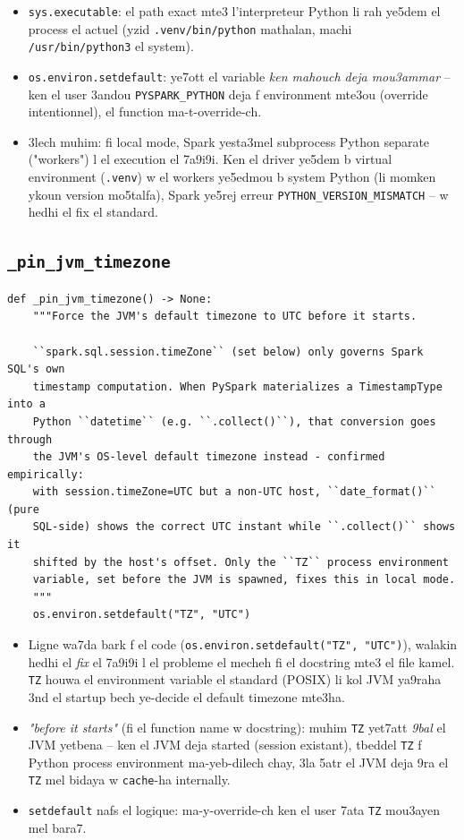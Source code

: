 \documentclass[11pt,a4paper]{report}
\DeclareRobustCommand{\code}[1]{\texttt{#1}}
\begin{document}
\begin{itemize}
  \item \code{sys.executable}: el path exact mte3 l'interpreteur Python li
        rah ye5dem el process el actuel (yzid \code{.venv/bin/python} mathalan,
        machi \code{/usr/bin/python3} el system).
  \item \code{os.environ.setdefault}: ye7ott el variable \emph{ken mahouch
        deja mou3ammar} -- ken el user 3andou \code{PYSPARK\_PYTHON} deja
        f environment mte3ou (override intentionnel), el function
        ma-t-override-ch.
  \item 3lech muhim: fi local mode, Spark yesta3mel subprocess Python
        separate ("workers") l el execution el 7a9i9i. Ken el driver ye5dem
        b virtual environment (\code{.venv}) w el workers ye5edmou b system
        Python (li momken ykoun version mo5talfa), Spark ye5rej erreur
        \code{PYTHON\_VERSION\_MISMATCH} -- w hedhi el fix el standard.
\end{itemize}

\subsection{\code{\_pin\_jvm\_timezone}}

\begin{lstlisting}[style=pystyle]
def _pin_jvm_timezone() -> None:
    """Force the JVM's default timezone to UTC before it starts.

    ``spark.sql.session.timeZone`` (set below) only governs Spark SQL's own
    timestamp computation. When PySpark materializes a TimestampType into a
    Python ``datetime`` (e.g. ``.collect()``), that conversion goes through
    the JVM's OS-level default timezone instead - confirmed empirically:
    with session.timeZone=UTC but a non-UTC host, ``date_format()`` (pure
    SQL-side) shows the correct UTC instant while ``.collect()`` shows it
    shifted by the host's offset. Only the ``TZ`` process environment
    variable, set before the JVM is spawned, fixes this in local mode.
    """
    os.environ.setdefault("TZ", "UTC")
\end{lstlisting}

\begin{itemize}
  \item Ligne wa7da bark f el code (\code{os.environ.setdefault("TZ", "UTC")}),
        walakin hedhi el \emph{fix} el 7a9i9i l el probleme el mecheh fi el
        docstring mte3 el file kamel. \code{TZ} houwa el environment variable
        el standard (POSIX) li kol JVM ya9raha 3nd el startup bech ye-decide
        el default timezone mte3ha.
  \item \emph{"before it starts"} (fi el function name w docstring): muhim
        \code{TZ} yet7att \emph{9bal} el JVM yetbena -- ken el JVM deja
        started (session existant), tbeddel \code{TZ} f Python process
        environment ma-yeb-dilech chay, 3la 5atr el JVM deja 9ra el
        \code{TZ} mel bidaya w \code{cache}-ha internally.
  \item \code{setdefault} nafs el logique: ma-y-override-ch ken el user
        7ata \code{TZ} mou3ayen mel bara7.
\end{itemize}
\end{document}
